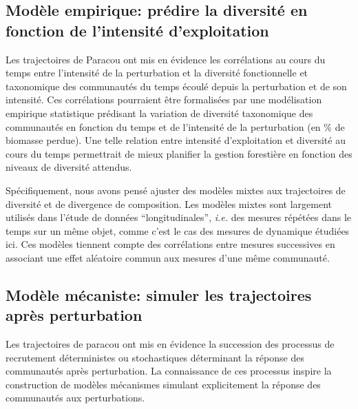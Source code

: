 \documentclass[
  11pt,
  french,
  A4paper,
  extrafontsizes,onecolumn,openright
  ]{memoir}
\begin{document}
\subsection{Modèle empirique: prédire la diversité en fonction de
l'intensité
d'exploitation}\label{modele-empirique-predire-la-diversite-en-fonction-de-lintensite-dexploitation}

Les trajectoires de Paracou ont mis en évidence les corrélations au
cours du temps entre l'intensité de la perturbation et la diversité
fonctionnelle et taxonomique des communautés du temps écoulé depuis la
perturbation et de son intensité. Ces corrélations pourraient être
formalisées par une modélisation empirique statistique prédisant la
variation de diversité taxonomique des communautés en fonction du temps
et de l'intensité de la perturbation (en \% de biomasse perdue). Une
telle relation entre intensité d'exploitation et diversité au cours du
temps permettrait de mieux planifier la gestion forestière en fonction
des niveaux de diversité attendus.

Spécifiquement, nous avons pensé ajuster des modèles mixtes aux
trajectoires de diversité et de divergence de composition. Les modèles
mixtes sont largement utilisés dans l'étude de données
``longitudinales'', \emph{i.e.} des mesures répétées dans le temps sur
un même objet, comme c'est le cas des mesures de dynamique étudiées ici.
Ces modèles tiennent compte des corrélations entre mesures successives
en associant une effet aléatoire commun aux mesures d'une même
communauté.

\subsection{Modèle mécaniste: simuler les trajectoires après
perturbation}\label{modele-mecaniste-simuler-les-trajectoires-apres-perturbation}

Les trajectoires de paracou ont mis en évidence la succession des
processus de recrutement déterministes ou stochastiques déterminant la
réponse des communautés après perturbation. La connaissance de ces
processus inspire la construction de modèles mécanismes simulant
explicitement la réponse des communautés aux perturbations.
\end{document}
